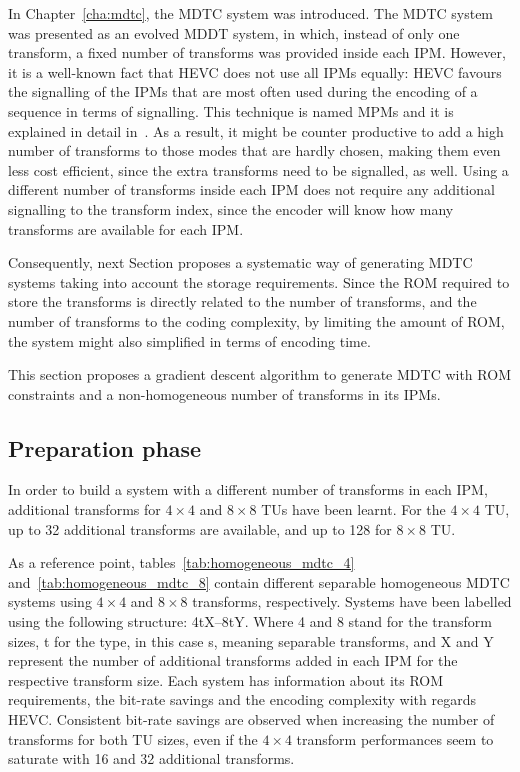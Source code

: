 \documentclass[11pt,a4paper,openright,twoside]{book}
\numberwithin{equation}{section} %
\numberwithin{figure}{section} %
\numberwithin{table}{section} %
\begin{document}
In Chapter~\ref{cha:mdtc}, the \ac{MDTC} system was introduced.
The \ac{MDTC} system was presented as an evolved \ac{MDDT} system, in which,
instead of only one transform, a fixed number of transforms was provided
inside each \ac{IPM}.
However, it is a well-known fact that \ac{HEVC} does not use all \acp{IPM}
equally:
\ac{HEVC} favours the signalling of the \acp{IPM} that are most often used
during the encoding of a sequence in terms of signalling.
This technique is named \acp{MPM} and it is explained in detail
in~\cite{wien-15-hevc}.
As a result, it might be counter productive to add a high number of transforms
to those modes that are hardly chosen, making them even less cost efficient,
since the extra transforms need to be signalled, as well.
Using a different number of transforms inside each \ac{IPM} does not require
any additional signalling to the transform index, since the encoder will know
how many transforms are available for each \ac{IPM}.

Consequently, next Section proposes a systematic way of generating \ac{MDTC}
systems taking into account the storage requirements.
Since the \acs{ROM} required to store the transforms is directly related to
the number of transforms, and the number of transforms to the coding
complexity, by limiting the amount of \acs{ROM}, the system might also
simplified in terms of encoding time.

This section proposes a gradient descent algorithm to generate \ac{MDTC} with
\acs{ROM} constraints and a non-homogeneous number of transforms in its
\acp{IPM}.

\subsection{Preparation phase}
\label{sub:rw_preparation_phase}

In order to build a system with a different number of transforms in each
\ac{IPM}, additional transforms for $4\times4$ and $8\times8$ \acp{TU} have
been learnt.
For the $4\times4$ \ac{TU}, up to 32 additional transforms are available, and
up to 128 for $8\times8$ \ac{TU}.

As a reference point, tables~\ref{tab:homogeneous_mdtc_4}
and~\ref{tab:homogeneous_mdtc_8} contain different separable homogeneous
\ac{MDTC} systems using $4\times4$ and $8\times8$ transforms, respectively.
Systems have been labelled using the following structure: {4tX--8tY}.
Where 4 and 8 stand for the transform sizes, t for the type, in this case s,
meaning separable transforms, and X and Y represent the number of additional
transforms added in each \ac{IPM} for the respective transform size.
Each system has information about its \acs{ROM} requirements, the bit-rate
savings and the encoding complexity with regards \ac{HEVC}.
Consistent bit-rate savings are observed when increasing the number of
transforms for both \ac{TU} sizes, even if the $4\times4$ transform
performances seem to saturate with 16 and 32 additional transforms.
\end{document}
